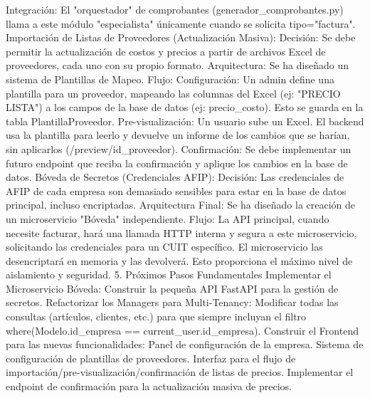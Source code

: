 Integración: El "orquestador" de comprobantes (generador_comprobantes.py) llama a este módulo "especialista" únicamente cuando se solicita tipo="factura".
Importación de Listas de Proveedores (Actualización Masiva):
Decisión: Se debe permitir la actualización de costos y precios a partir de archivos Excel de proveedores, cada uno con su propio formato.
Arquitectura: Se ha diseñado un sistema de Plantillas de Mapeo.
Flujo:
Configuración: Un admin define una plantilla para un proveedor, mapeando las columnas del Excel (ej: "PRECIO LISTA") a los campos de la base de datos (ej: precio_costo). Esto se guarda en la tabla PlantillaProveedor.
Pre-visualización: Un usuario sube un Excel. El backend usa la plantilla para leerlo y devuelve un informe de los cambios que se harían, sin aplicarlos (/preview/{id_proveedor}).
Confirmación: Se debe implementar un futuro endpoint que reciba la confirmación y aplique los cambios en la base de datos.
Bóveda de Secretos (Credenciales AFIP):
Decisión: Las credenciales de AFIP de cada empresa son demasiado sensibles para estar en la base de datos principal, incluso encriptadas.
Arquitectura Final: Se ha diseñado la creación de un microservicio "Bóveda" independiente.
Flujo: La API principal, cuando necesite facturar, hará una llamada HTTP interna y segura a este microservicio, solicitando las credenciales para un CUIT específico. El microservicio las desencriptará en memoria y las devolverá. Esto proporciona el máximo nivel de aislamiento y seguridad.
5. Próximos Pasos Fundamentales
Implementar el Microservicio Bóveda: Construir la pequeña API FastAPI para la gestión de secretos.
Refactorizar los Managers para Multi-Tenancy: Modificar todas las consultas (artículos, clientes, etc.) para que siempre incluyan el filtro where(Modelo.id_empresa == current_user.id_empresa).
Construir el Frontend para las nuevas funcionalidades:
Panel de configuración de la empresa.
Sistema de configuración de plantillas de proveedores.
Interfaz para el flujo de importación/pre-visualización/confirmación de listas de precios.
Implementar el endpoint de confirmación para la actualización masiva de precios.


